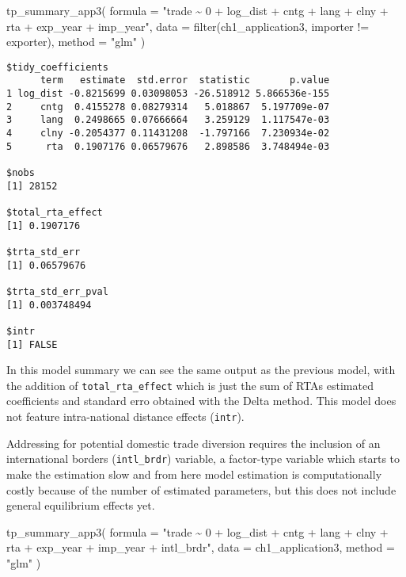 \documentclass[12pt,reqno,oneside,pdftex]{formato-puc/puctesis} %
\newenvironment{Shaded}{\begin{snugshade}}{\end{snugshade}}
\newcommand{\AttributeTok}[1]{\textcolor[rgb]{0.77,0.63,0.00}{#1}}
\newcommand{\FunctionTok}[1]{\textcolor[rgb]{0.00,0.00,0.00}{#1}}
\newcommand{\NormalTok}[1]{#1}
\newcommand{\SpecialCharTok}[1]{\textcolor[rgb]{0.00,0.00,0.00}{#1}}
\newcommand{\StringTok}[1]{\textcolor[rgb]{0.31,0.60,0.02}{#1}}
\begin{document}
\begin{Shaded}
\begin{Highlighting}[]
\FunctionTok{tp\_summary\_app3}\NormalTok{(}
  \AttributeTok{formula =} \StringTok{"trade \textasciitilde{} 0 + log\_dist + cntg + lang + clny +}
\StringTok{    rta + exp\_year + imp\_year"}\NormalTok{,}
  \AttributeTok{data =} \FunctionTok{filter}\NormalTok{(ch1\_application3, importer }\SpecialCharTok{!=}\NormalTok{ exporter),}
  \AttributeTok{method =} \StringTok{"glm"}
\NormalTok{)}
\end{Highlighting}
\end{Shaded}

\begin{verbatim}
$tidy_coefficients
      term   estimate  std.error  statistic       p.value
1 log_dist -0.8215699 0.03098053 -26.518912 5.866536e-155
2     cntg  0.4155278 0.08279314   5.018867  5.197709e-07
3     lang  0.2498665 0.07666664   3.259129  1.117547e-03
4     clny -0.2054377 0.11431208  -1.797166  7.230934e-02
5      rta  0.1907176 0.06579676   2.898586  3.748494e-03

$nobs
[1] 28152

$total_rta_effect
[1] 0.1907176

$trta_std_err
[1] 0.06579676

$trta_std_err_pval
[1] 0.003748494

$intr
[1] FALSE
\end{verbatim}

In this model summary we can see the same output as the previous model,
with the addition of \texttt{total\_rta\_effect} which is just the sum
of RTAs estimated coefficients and standard erro obtained with the Delta
method. This model does not feature intra-national distance effects
(\texttt{intr}).

Addressing for potential domestic trade diversion requires the inclusion
of an international borders (\texttt{intl\_brdr}) variable, a
factor-type variable which starts to make the estimation slow and from
here model estimation is computationally costly because of the number of
estimated parameters, but this does not include general equilibrium
effects yet.

\begin{Shaded}
\begin{Highlighting}[]
\FunctionTok{tp\_summary\_app3}\NormalTok{(}
  \AttributeTok{formula =} \StringTok{"trade \textasciitilde{} 0 + log\_dist + cntg + lang + clny +}
\StringTok{    rta + exp\_year + imp\_year + intl\_brdr"}\NormalTok{,}
  \AttributeTok{data =}\NormalTok{ ch1\_application3,}
  \AttributeTok{method =} \StringTok{"glm"}
\NormalTok{)}
\end{Highlighting}
\end{Shaded}
\end{document}
